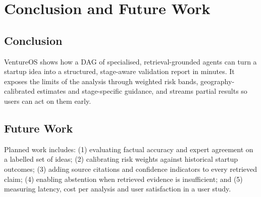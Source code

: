 \section{Conclusion and Future Work}
\subsection{Conclusion}
VentureOS shows how a DAG of specialised, retrieval-grounded agents can turn a startup idea into a structured, stage-aware validation report in minutes. It exposes the limits of the analysis through weighted risk bands, geography-calibrated estimates and stage-specific guidance, and streams partial results so users can act on them early.

\subsection{Future Work}
Planned work includes: (1) evaluating factual accuracy and expert agreement on a labelled set of ideas; (2) calibrating risk weights against historical startup outcomes; (3) adding source citations and confidence indicators to every retrieved claim; (4) enabling abstention when retrieved evidence is insufficient; and (5) measuring latency, cost per analysis and user satisfaction in a user study.

